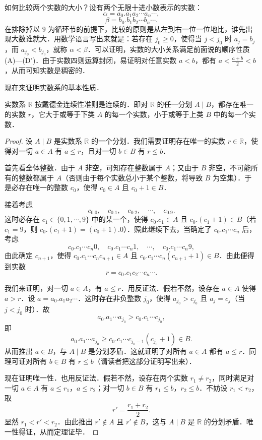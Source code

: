 如何比较两个实数的大小？设有两个无限十进小数表示的实数：
\[
\alpha = a_0.a_1a_2\cdots a_n\cdots,
\]
\[
\beta = b_0.b_1b_2\cdots b_n\cdots.
\]
在排除掉以 $9$ 为循环节的前提下，比较的原则是从左到右一位一位地比，谁先出现大数谁就大．用数学语言写出来就是：若存在 $j_0\geqslant 0$，使得当 $j<j_0$ 时 $a_j=b_j$，而 $a_{j_0}<b_{j_0}$，就称 $\alpha<\beta$．可以证明，实数的大小关系满足前面说的顺序性质 (A)—(D$'$)．由于实数四则运算封闭，易证明对任意实数 $a<b$，都有 $a<\frac{a+b}{2}<b$，从而可知实数是稠密的．

现在来证明实数系的基本性质．

\begin{theorem}
实数系 $\mathbb{R}$ 按戴德金连续性准则是连续的．即对 $\mathbb{R}$ 的任一分划 $A\mid B$，都存在唯一的实数 $r$，它大于或等于下类 $A$ 的每一个实数，小于或等于上类 $B$ 中的每一个实数．
\label{thm:1.2}
\end{theorem}

\begin{proof}
设 $A\mid B$ 是实数系 $\mathbb{R}$ 的一个分划．我们需要证明存在唯一的实数 $r\in\mathbb{R}$，使得对一切 $a\in A$ 有 $a\leqslant r$，且对一切 $b\in B$ 有 $r\leqslant b$．

首先看全体整数．由于 $A$ 非空，可知存在整数属于 $A$；又由于 $B$ 非空，不可能所有的整数都属于 $A$（否则由于每个实数总小于某个整数，将导致 $B$ 为空集）．于是必存在唯一的整数 $c_0$，使得 $c_0\in A$ 且 $c_0+1\in B$．

接着考虑
\[
c_0.0,\quad c_0.1,\quad c_0.2,\quad \cdots,\quad c_0.9.
\]
这时必存在 $c_1\in\{0,1,\cdots,9\}$ 中的某一个，使得 $c_0.c_1\in A$ 且 $c_0.(c_1+1)\in B$（若 $c_1=9$，则 $c_0.(c_1+1)=(c_0+1).0$）．照此继续下去，当确定了 $c_0.c_1\cdots c_n$ 后，考虑
\[
c_0.c_1\cdots c_n 0,\quad c_0.c_1\cdots c_n 1,\quad \cdots,\quad c_0.c_1\cdots c_n 9,
\]
由此确定 $c_{n+1}$，使得 $c_0.c_1\cdots c_n c_{n+1}\in A$ 且 $c_0.c_1\cdots c_n (c_{n+1}+1)\in B$．由此便得到实数
\[
r = c_0.c_1c_2\cdots c_n\cdots.
\]

我们来证明，对一切 $a\in A$，有 $a\leqslant r$．用反证法．假若不然，设存在 $a\in A$ 使得 $a>r$．设 $a=a_0.a_1a_2\cdots$．这时存在非负整数 $j_0$，使得 $a_{j_0}>c_{j_0}$ 且 $a_j=c_j$（当 $j<j_0$ 时）．故
\[
a_0.a_1\cdots a_{j_0} > c_0.c_1\cdots c_{j_0},
\]
即
\[
a_0.a_1\cdots a_{j_0} \geqslant c_0.c_1\cdots c_{j_0-1}(c_{j_0}+1)\in B.
\]
从而推出 $a\in B$，与 $A\mid B$ 是分划矛盾．这就证明了对所有 $a\in A$ 都有 $a\leqslant r$．同理可证对所有 $b\in B$ 有 $r\leqslant b$（请读者把这部分证明写出来）．

现在证明唯一性．也用反证法．假若不然，设存在两个实数 $r_1\neq r_2$，同时满足对一切 $a\in A$ 有 $a\leqslant r_1$，$a\leqslant r_2$；对一切 $b\in B$ 有 $r_1\leqslant b$，$r_2\leqslant b$．不妨设 $r_1<r_2$，取
\[
r' = \frac{r_1+r_2}{2}.
\]
显然 $r_1<r'<r_2$．由此推出 $r'\notin A$ 且 $r'\notin B$，这与 $A\mid B$ 是 $\mathbb{R}$ 的分划矛盾．唯一性得证，从而定理证毕．
\end{proof}

